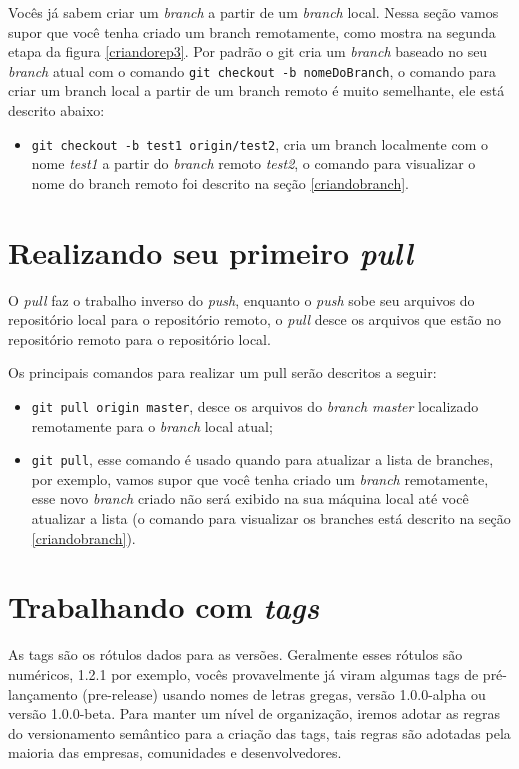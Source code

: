 \documentclass[12pt,openright,oneside,a4paper,english,brazil]{abntex2}
\begin{document}
Vocês já sabem criar um \textit{branch} a partir de um \textit{branch} local. Nessa seção vamos supor que você tenha criado um branch remotamente, como mostra na segunda etapa da figura \ref{criandorep3}. Por padrão o git cria um \textit{branch} baseado no seu \textit{branch} atual com o comando \verb|git checkout -b nomeDoBranch|, o comando para criar um branch local a partir de um branch remoto é muito semelhante, ele está descrito abaixo:

\begin{itemize}
	\item \verb|git checkout -b test1 origin/test2|, cria um branch localmente com o nome \textit{test1} a partir do \textit{branch} remoto \textit{test2}, o comando para visualizar o nome do branch remoto foi descrito na seção \ref{criandobranch}.	
\end{itemize}

\section{Realizando seu primeiro \textit{pull}}

O \textit{pull} faz o trabalho inverso do \textit{push}, enquanto o \textit{push} sobe seu arquivos do repositório local para o repositório remoto, o \textit{pull} desce os arquivos que estão no repositório remoto para o repositório local. 

Os principais comandos para realizar um pull serão descritos a seguir:

\begin{itemize}
	\item \verb|git pull origin master|, desce os arquivos do \textit{branch master} localizado remotamente para o \textit{branch} local atual;
	\item \verb|git pull|, esse comando é usado quando para atualizar a lista de branches, por exemplo, vamos supor que você tenha criado um \textit{branch} remotamente, esse novo \textit{branch} criado não será exibido na sua máquina local até você atualizar a lista (o comando para visualizar os branches está descrito na seção \ref{criandobranch}).
\end{itemize}

\section{Trabalhando com \textit{tags} \label{tags}}

As tags são os rótulos dados para as versões. Geralmente esses rótulos são numéricos, 1.2.1 por exemplo, vocês provavelmente já viram algumas tags de pré-lançamento (pre-release) usando nomes de letras gregas, versão 1.0.0-alpha ou versão 1.0.0-beta. Para manter um nível de organização, iremos adotar as regras do versionamento semântico para a criação das tags, tais regras são adotadas pela maioria das empresas, comunidades e desenvolvedores.
\end{document}

